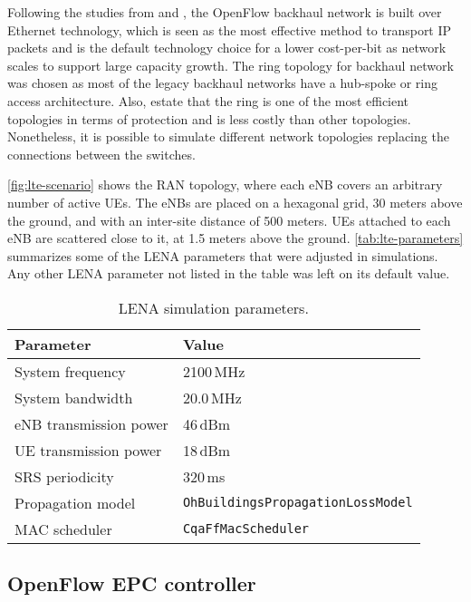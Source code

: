 Following the studies from \citet{Chundury2008} and \citet{Howard2011}, the
OpenFlow backhaul network is built over Ethernet technology, which is seen as
the most effective method to transport \ac{IP} packets and is the default
technology choice for a lower cost-per-bit as network scales to support large
capacity growth. The ring topology for backhaul network was chosen as most of
the legacy backhaul networks have a hub-spoke or ring access architecture.
Also, \citet{Nadiv2010} estate that the ring is one of the most efficient
topologies in terms of protection and is less costly than other topologies.
Nonetheless, it is possible to simulate different network topologies replacing
the connections between the switches.

\autoref{fig:lte-scenario} shows the \ac{RAN} topology, where each \ac{eNB}
covers an arbitrary number of active \acp{UE}. The \acp{eNB} are placed on a
hexagonal grid, 30 meters above the ground, and with an inter-site distance of
500 meters. \acp{UE} attached to each \ac{eNB} are scattered close to it, at
1.5 meters above the ground. \autoref{tab:lte-parameters} summarizes some of
the \ac{LENA} parameters that were adjusted in simulations. Any other \ac{LENA}
parameter not listed in the table was left on its default value.

\begin{table}[htb]
  \caption{\acs{LENA} simulation parameters.}
  \label{tab:lte-parameters}
  \centering
  \begin{tabular}{ll}
    \toprule
    \bfseries Parameter & \bfseries Value\\
    \midrule
    System frequency             & 2100\,MHz \\
    System bandwidth             & 20.0\,MHz \\
    \acs{eNB} transmission power & 46\,dBm \\
    \acs{UE} transmission power  & 18\,dBm \\
    \acs{SRS} periodicity        & 320\,ms \\
    Propagation model            & \texttt{OhBuildingsPropagationLossModel} \\
    MAC scheduler                & \texttt{CqaFfMacScheduler} \\
    \bottomrule
  \end{tabular}
\end{table}


\subsection{OpenFlow \acs{EPC} controller}
\label{sec:controller}


